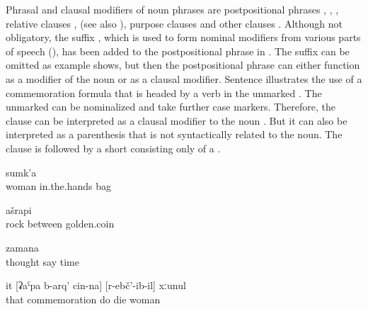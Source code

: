 Phrasal and clausal modifiers of noun phrases are postpositional phrases , , , relative clauses ,  (see also ), purpose clauses  and other clauses . Although not obligatory, the suffix , which is used to form nominal modifiers from various parts of speech (), has been added to the postpositional phrase in . The suffix can be omitted as example  shows, but then the postpositional phrase can either function as a modifier of the noun or as a clausal modifier. Sentence  illustrates the use of a commemoration formula that is headed by a verb in the unmarked . The unmarked  can be nominalized and take further case markers. Therefore, the  clause can be interpreted as a clausal modifier to the noun  . But it can also be interpreted as a parenthesis that is not syntactically related to the noun. The  clause is followed by a short  consisting only of a .

\begin{exe}

		\ex	\label{ex:the bag in the hands of the woman@9b}
			sumk'a\\
			woman	in.the.hands	bag\\
		\glt	{}
	
		\ex	\label{ex:the golden coin between the rocks}
			ašrapi\\
			rock	between	golden.coin\\
		\glt	{}
	
		\ex	\label{ex:time to think}
		\gll	[pikri	∅-ik'ʷ-ij]	zamana\\
			thought	say	time\\
		\glt	{}
	
		\ex	\label{ex:that dead woman, may she rest in peace@9c}
		\gll	it	[ʡaˁpa	b-arq'	cin-na]	[r-ebč'-ib-il]	xːunul\\
			that	commemoration	do		die	woman\\
		\glt	{}

\end{exe}


